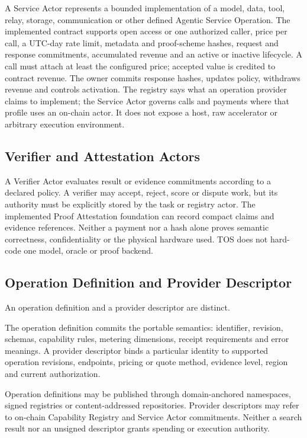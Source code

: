 \documentclass[11pt,oneside]{article}
\begin{document}
A Service Actor represents a bounded implementation of a model, data, tool, relay, storage,
communication or other defined Agentic Service Operation. The implemented
contract supports open access or one authorized caller, price per call, a UTC-day rate limit,
metadata and proof-scheme hashes, request and response commitments, accumulated revenue and an
active or inactive lifecycle. A call must attach at least the configured price; accepted value
is credited to contract revenue. The owner commits response hashes, updates policy, withdraws
revenue and controls activation. The registry says what an operation provider claims to implement; the Service Actor governs
calls and payments where that profile uses an on-chain actor. It does not expose a host, raw accelerator or
arbitrary execution environment.

\subsection{Verifier and Attestation Actors}

A Verifier Actor evaluates result or evidence commitments according to a declared policy. A
verifier may accept, reject, score or dispute work, but its authority must be explicitly stored
by the task or registry actor. The implemented Proof Attestation foundation can record compact
claims and evidence references. Neither a payment nor a hash alone proves semantic
correctness, confidentiality or the physical hardware used. TOS does not hard-code one model,
oracle or proof backend.


\subsection{Operation Definition and Provider Descriptor}

An operation definition and a provider descriptor are distinct.

The operation definition commits the portable semantics: identifier, revision, schemas,
capability rules, metering dimensions, receipt requirements and error meanings. A provider
descriptor binds a particular identity to supported operation revisions, endpoints, pricing
or quote method, evidence level, region and current authorization.

Operation definitions may be published through domain-anchored namespaces, signed registries
or content-addressed repositories. Provider descriptors may refer to on-chain Capability
Registry and Service Actor commitments. Neither a search result nor an unsigned descriptor
grants spending or execution authority.
\end{document}
